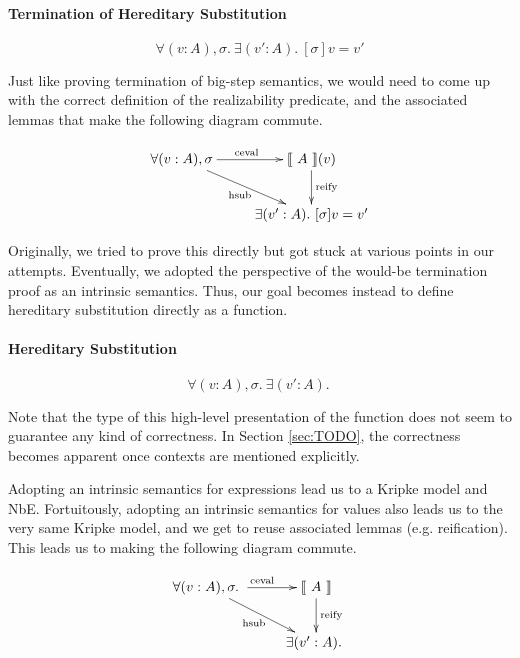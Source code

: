 \documentclass[preprint,nonatbib]{sigplanconf}
\numberwithin{mysubdfn}{mydfn}
\newcommand{\refsec}[1]{Section \ref{sec:#1}}
\newcommand{\hsub}[2]{[\sigma]#1=#2}
\newcommand{\ascribe}[2]{(#1 : #2)}
\newcommand{\all}[1]{\forall#1.~}
\newcommand{\ex}[1]{\exists#1.~}
\newcommand{\el}[1]{\llbracket ~ #1 ~ \rrbracket}
\newcommand{\fun}[1]{\textmd{#1}}
\begin{document}
\paragraph{Termination of Hereditary Substitution}

$$
\all{\ascribe{v}{A}, \sigma} \ex{\ascribe{v'}{A}} \hsub{v}{v'}
$$

Just like proving termination of big-step semantics, we would need to
come up with the correct definition of the realizability predicate,
and the associated lemmas that make the following diagram commute.

\begin{displaymath}
    \xymatrix{
          {\forall (v : A), \sigma} 
          \ar[dr]_{\fun{hsub}}
          \ar[r]^{\fun{ceval}}
        & {\el{A}(v)}
          \ar[d]^{\large{\fun{reify}}}
\\      & {\exists (v' : A). ~ [ \sigma ] v = v'} }
\end{displaymath}

Originally, we tried to prove this directly but got stuck at various
points in our attempts. Eventually, we adopted the perspective of the
would-be termination proof as an intrinsic semantics. Thus, our goal
becomes instead to define hereditary substitution directly as a
function.

\paragraph{Hereditary Substitution}
$$
\all{\ascribe{v}{A}, \sigma} \ex{\ascribe{v'}{A}}
$$

Note that the type of this high-level presentation of the function does
not seem to guarantee any kind of correctness. In \refsec{TODO}, the
correctness becomes apparent once contexts are mentioned explicitly.

Adopting an intrinsic semantics for expressions lead us to a Kripke
model and NbE. Fortuitously, adopting an intrinsic semantics for
values also leads us to the very same Kripke model, and we get to
reuse associated lemmas (e.g. reification). This leads us to making
the following diagram commute.

\begin{displaymath}
    \xymatrix{
          \all{\ascribe{v}{A}, \sigma}
          \ar[dr]_{\fun{hsub}}
          \ar[r]^{\fun{ceval}}
        & {\el{A}}
          \ar[d]^{\large{\fun{reify}}}
\\      & \ex{\ascribe{v'}{A}} }
\end{displaymath}
\end{document}
